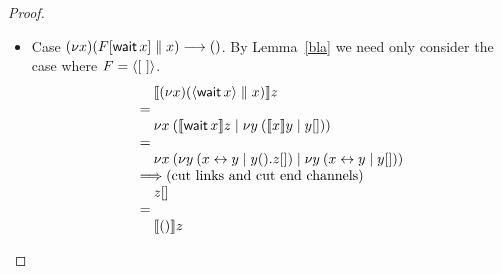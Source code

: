 \documentclass[orivec,envcountsame]{llncs}
\begin{document}
\begin{proof}
\begin{itemize}

\item Case $(\nu x)(F[\mathsf{wait} \, x] \parallel x) \longrightarrow ()$.
By Lemma~\ref{bla} we need only consider the case where $F = \langle [~] \rangle$.
\[
\bl
\quad \tocp{(\nu x)(\distinguish{\gvconst{wait} \app x} \parallel x)}z \\
= \\
\quad \cut{x}{}{\tocp{\gvconst{wait} \app x}z}{\cut{y}{}{\tocp{x}{y}}{y[]}} \\
= \\
\quad \cut{x}{}{\cut{y}{}{\link x y}{y().z[]}}{\cut{y}{}{\link x y}{y[]}} \\
\Longrightarrow (\text{cut links and cut end channels}) \\
\quad z[] \\
= \\
\quad \tocp{()}z
\el
\]

\end{itemize}
\end{proof}
\end{document}
